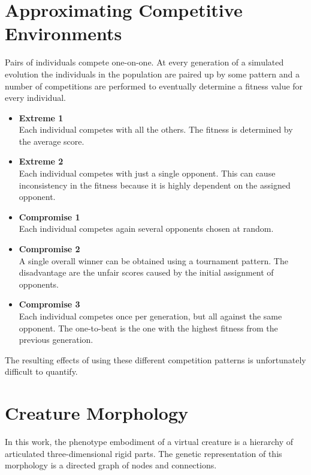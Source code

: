 \documentclass[../main.tex]{subfiles}
\begin{document}
\section{Approximating Competitive Environments}

Pairs of individuals compete one-on-one. At every generation of a simulated evolution the individuals in the population
are paired up by some pattern and a number of competitions are performed to eventually determine a fitness value for
every individual.

\begin{itemize}
	\item \textbf{Extreme 1} \\
	Each individual competes with all the others. The fitness is determined by the average score.
	\item \textbf{Extreme 2} \\
	Each individual competes with just a single opponent. This can cause inconsistency in the fitness because it is
	highly dependent on the assigned opponent.
	\item \textbf{Compromise 1} \\
	Each individual competes again several opponents chosen at random.
	\item \textbf{Compromise 2} \\
	A single overall winner can be obtained using a tournament pattern. The disadvantage are the unfair scores caused
	by the initial assignment of opponents.
	\item \textbf{Compromise 3} \\
	Each individual competes once per generation, but all against the same opponent. The one-to-beat is the one with
	the highest fitness from the previous generation.
\end{itemize}

The resulting effects of using these different competition patterns is unfortunately difficult to quantify.

\section{Creature Morphology}

In this work, the phenotype embodiment of a virtual creature is a hierarchy of articulated three-dimensional rigid
parts. The genetic representation of this morphology is a directed graph of nodes and connections.
\end{document}
